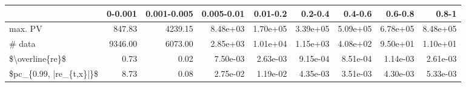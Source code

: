\begin{tabular}{lrrrrrrrr}
\toprule
{} &  0-0.001 &  0.001-0.005 &  0.005-0.01 &  0.01-0.2 &   0.2-0.4 &   0.4-0.6 &   0.6-0.8 &     0.8-1 \\
\midrule
max. PV                 &   847.83 &      4239.15 &    8.48e+03 &  1.70e+05 &  3.39e+05 &  5.09e+05 &  6.78e+05 &  8.48e+05 \\
\# data                  &  9346.00 &      6073.00 &    2.85e+03 &  1.01e+04 &  1.15e+03 &  4.08e+02 &  9.50e+01 &  1.10e+01 \\
\$\textbackslash overline\{re\}\$         &     0.73 &         0.02 &    7.50e-03 &  2.63e-03 &  9.15e-04 &  8.51e-04 &  1.14e-03 &  2.61e-03 \\
\$pc\_\{0.99, |re\_\{t,x\}|\}\$ &     8.73 &         0.08 &    2.75e-02 &  1.19e-02 &  4.35e-03 &  3.51e-03 &  4.30e-03 &  5.33e-03 \\
\bottomrule
\end{tabular}
